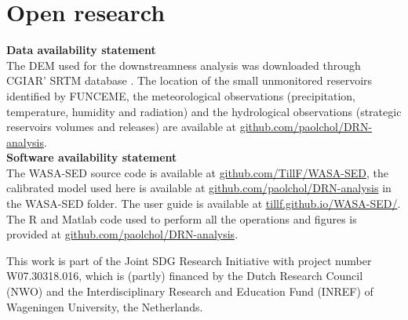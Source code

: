 \documentclass[draft]{agujournal2019}
\begin{document}
\section{Open research}

\textbf{Data availability statement}\\
The DEM used for the downstreamness analysis was downloaded through CGIAR’ SRTM database \cite{CIAT2021}. The location of the small unmonitored reservoirs identified by FUNCEME, the meteorological observations (precipitation, temperature, humidity and radiation) and the hydrological observations (strategic reservoirs volumes and releases) are available at \url{github.com/paolchol/DRN-analysis}.\\

\textbf{Software availability statement}\\
The WASA-SED source code is available at \url{github.com/TillF/WASA-SED}, the calibrated model used here is available at \url{github.com/paolchol/DRN-analysis} in the WASA-SED folder. The user guide is available at \url{tillf.github.io/WASA-SED/}. The R and Matlab code used to perform all the operations and figures is provided at \url{github.com/paolchol/DRN-analysis}.



%

\acknowledgments
This work is part of the Joint SDG Research Initiative with project number W07.30318.016, which is (partly) financed by the Dutch Research Council (NWO) and the Interdisciplinary Research and Education Fund (INREF) of Wageningen University, the Netherlands.
\clearpage
\end{document}
